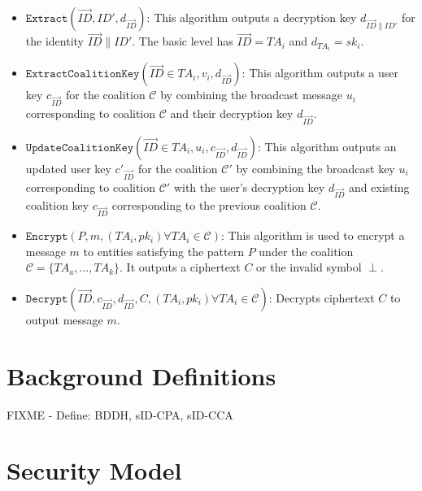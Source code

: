\documentclass[10pt]{llncs}
\newcommand{\C}{\mathcal{C}}
\newcommand{\ID}{\mathit{ID}}
\newcommand{\TA}{\mathit{TA}}
\begin{document}
\begin{itemize}
\item $\texttt{Extract}(\vec{ID},\ID',d_{\vec{\ID}})$: This algorithm outputs a decryption key $d_{\vec{\ID}\|\ID'}$ for the identity $\vec{\ID} \| \ID'$. The basic level has $\vec{\ID}=\TA_i$ and $d_{\TA_i}= sk_i$.
\medskip

\item $\texttt{ExtractCoalitionKey}(\vec{\ID} \in \TA_i, v_i, d_{\vec{\ID}})$: This algorithm outputs a user key $c_{\vec{\ID}}$ for the coalition $\C$ by combining the broadcast message $u_i$ corresponding to coalition $\C$ and their decryption key $d_{\vec{\ID}}$.
\medskip

\item $\texttt{UpdateCoalitionKey}(\vec{\ID} \in \TA_i, u_i , c_{\vec{\ID}}, d_{\vec{\ID}})$: This algorithm outputs an updated user key $c'_{\vec{\ID}}$ for the coalition $\C'$ by combining the broadcast key $u_i$ corresponding to coalition $\C'$ with the user's decryption key $d_{\vec{\ID}}$ and existing coalition key $c_{\vec{\ID}}$ corresponding to the previous coalition $\C$.
\medskip

\item $\texttt{Encrypt}(\mathit{P}, m, (\TA_i,pk_i) \forall \TA_i \in \C)$: This algorithm is used to encrypt a message $m$ to entities satisfying the pattern $\mathit{P}$ under the coalition $\C = \{\TA_a,\ldots,\TA_k\}$. It outputs a ciphertext $C$ or the invalid symbol $\perp$.
\medskip

\item $\texttt{Decrypt}(\vec{\ID}, c_{\vec{\ID}}, d_{\vec{\ID}}, C, (\TA_i,pk_i) \forall \TA_i \in \C)$: Decrypts ciphertext $C$ to output message $m$.
\end{itemize}

\section{Background Definitions}
FIXME - Define: BDDH, sID-CPA, sID-CCA

\section{Security Model}
\end{document}
